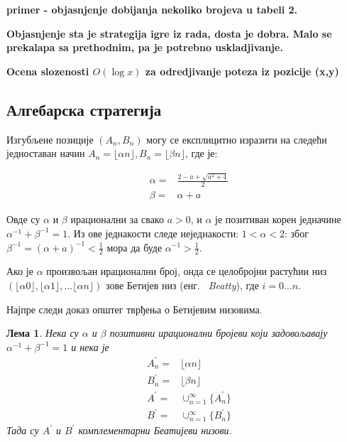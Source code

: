 \documentclass[a4paper]{article}
\newtheorem{lemma}{Лема}
\begin{document}
\textbf{primer - objasnjenje dobijanja nekoliko brojeva u tabeli 2.}

\textbf{Objasnjenje sta je strategija igre iz rada, dosta je dobra. Malo se prekalapa sa prethodnim, pa je potrebno uskladjivanje.
}

\textbf{Ocena slozenosti $ O(\log x) $ za odredjivanje poteza iz pozicije (x,y)}

\subsection{Алгебарска стратегија}

Изгубљене позиције $ (A_{n}, B_{n}) $ могу се експлицитно изразити на следећи једноставан начин $ A_{n} = \lfloor \alpha n \rfloor, B_{n} = \lfloor \beta n \rfloor $, где је:

\begin{eqnarray}
	&\alpha = &\frac{2 - a + \sqrt{a^2 + 4}}{2} \label{def:alpha}\\  
	&\beta = &\alpha + a \label{def:beta}
\end{eqnarray}

Овде су $ \alpha $ и $ \beta $ ирационални за свако $ a > 0 $, и $ \alpha $ је позитиван корен једначине $ \alpha^{-1} + \beta^{-1} = 1 $. Из ове једнакости следе неједнакости:
$ 1<\alpha<2 $: због $ \beta^{-1} = (\alpha+a)^{-1} < \frac{1}{2 }$ мора да буде $ \alpha^{-1} > \frac{1}{2} $.

Ако је $ \alpha $ произвољан ирационални број, онда се целобројни растућии низ $ (\lfloor \alpha 0 \rfloor, \lfloor \alpha 1 \rfloor, ... \lfloor \alpha n \rfloor) $ зове Бетијев низ (енг. {~\em Beatty}), где $ i = 0...n $.

Најпре следи доказ општег тврђења о Бетијевим низовима.

\begin{lemma}
	Нека су $ \alpha $ и $ \beta $ позитивни ирационални бројеви који задовољавају $ \alpha^{-1} + \beta^{-1} = 1 $ и нека је 
	\begin{eqnarray*} 
		&A_{n}^{'} = &\lfloor \alpha n \rfloor\\
		&B_{n}^{'} = &\lfloor \beta n \rfloor\\
		&A^{'} = &\cup_{n=1}^{\infty}\{A_{n}^{'}\}\\
		&B^{'} = &\cup_{n=1}^{\infty}\{B_{n}^{'}\}
	\end{eqnarray*}
	Тада су $ A^{'} $ и $ B^{'} $ комплементарни Беатијеви низови.
\end{lemma}
\end{document}
